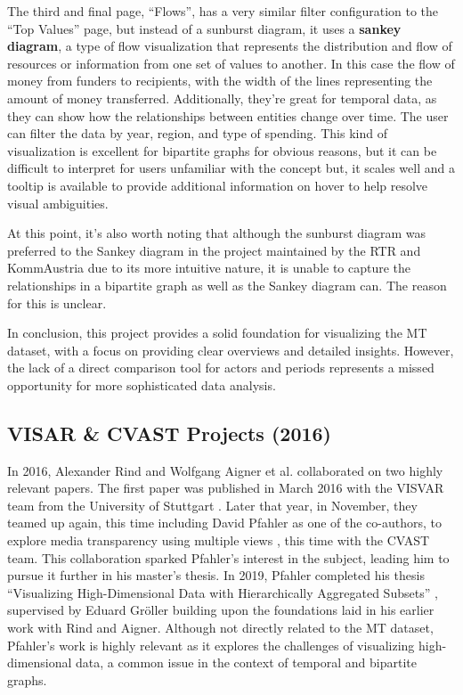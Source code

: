 \documentclass{vgtc}
\begin{document}
The third and final page, ``Flows'', has a very similar filter configuration to the ``Top Values'' page, but instead of a sunburst diagram, it uses a \textbf{sankey diagram}, a type of flow visualization that represents the distribution and flow of resources or information from one set of values to another. In this case the flow of money from funders to recipients, with the width of the lines representing the amount of money transferred. Additionally, they're great for temporal data, as they can show how the relationships between entities change over time. The user can filter the data by year, region, and type of spending. This kind of visualization is excellent for bipartite graphs for obvious reasons, but it can be difficult to interpret for users unfamiliar with the concept \textendash{} but, it scales well and a tooltip is available to provide additional information on hover to help resolve visual ambiguities.

At this point, it's also worth noting that although the sunburst diagram was preferred to the Sankey diagram in the project maintained by the RTR and KommAustria due to its more intuitive nature, it is unable to capture the relationships in a bipartite graph as well as the Sankey diagram can. The reason for this is unclear.

In conclusion, this project provides a solid foundation for visualizing the MT dataset, with a focus on providing clear overviews and detailed insights. However, the lack of a direct comparison tool for actors and periods represents a missed opportunity for more sophisticated data analysis.

\subsection{VISAR \& CVAST Projects (2016)}

In 2016, Alexander Rind and Wolfgang Aigner et al. collaborated on two highly relevant papers. The first paper was published in March 2016 with the VISVAR team from the University of Stuttgart \cite{aigner2016visual}. Later that year, in November, they teamed up again, this time including David Pfahler as one of the co-authors, to explore media transparency using multiple views \cite{rind2016exploring}, this time with the CVAST team. This collaboration sparked Pfahler's interest in the subject, leading him to pursue it further in his master's thesis. In 2019, Pfahler completed his thesis ``Visualizing High-Dimensional Data with Hierarchically Aggregated Subsets'' \cite{pfahlerflexible}, supervised by Eduard Gröller building upon the foundations laid in his earlier work with Rind and Aigner. Although not directly related to the MT dataset, Pfahler's work is highly relevant as it explores the challenges of visualizing high-dimensional data, a common issue in the context of temporal and bipartite graphs.
\end{document}
